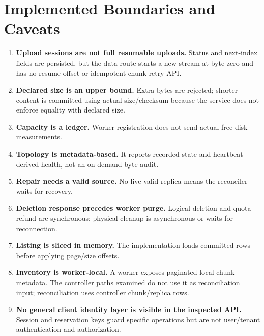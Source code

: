 \documentclass[11pt,a4paper]{article}
\begin{document}
\section{Implemented Boundaries and Caveats}
\begin{enumerate}
\item \textbf{Upload sessions are not full resumable uploads.} Status and next-index fields are persisted, but the data route starts a new stream at byte zero and has no resume offset or idempotent chunk-retry API.
\item \textbf{Declared size is an upper bound.} Extra bytes are rejected; shorter content is committed using actual size/checksum because the service does not enforce equality with declared size.
\item \textbf{Capacity is a ledger.} Worker registration does not send actual free disk measurements.
\item \textbf{Topology is metadata-based.} It reports recorded state and heartbeat-derived health, not an on-demand byte audit.
\item \textbf{Repair needs a valid source.} No live valid replica means the reconciler waits for recovery.
\item \textbf{Deletion response precedes worker purge.} Logical deletion and quota refund are synchronous; physical cleanup is asynchronous or waits for reconnection.
\item \textbf{Listing is sliced in memory.} The implementation loads committed rows before applying page/size offsets.
\item \textbf{Inventory is worker-local.} A worker exposes paginated local chunk metadata. The controller paths examined do not use it as reconciliation input; reconciliation uses controller chunk/replica rows.
\item \textbf{No general client identity layer is visible in the inspected API.} Session and reservation keys guard specific operations but are not user/tenant authentication and authorization.
\end{enumerate}
\end{document}
